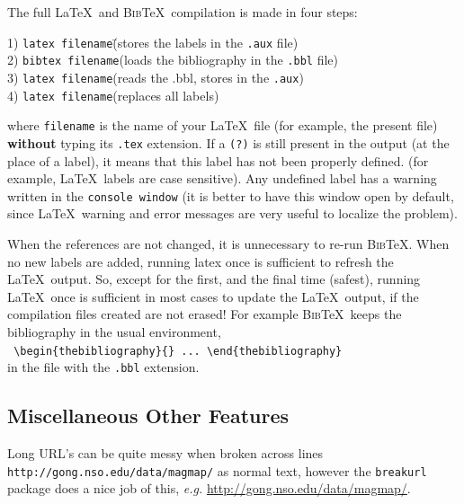 \documentclass[namedreferences]{solarphysics}
\newcommand{\BibTeX}{\textsc{Bib}\TeX}
\begin{document}
\begin{article}
   The full \LaTeX\ and \BibTeX\ compilation is made in four steps: 
\begin{tabbing}
1) {\tt latex filename}\qquad\qquad\=(stores the labels in the {\tt .aux} file)\\
2) {\tt bibtex filename}\>(loads the bibliography in the {\tt .bbl} file)\\
3) {\tt latex filename}\>(reads the .bbl, stores in the {\tt .aux})\\
4) {\tt latex filename}\>(replaces all labels)  
\end{tabbing}
   where \texttt{filename} is the name of your \LaTeX\ file (for example, 
the present file) {\bf without} typing its \texttt{.tex} extension.
If a \texttt{(?)} is still present in the output (at the place of a label),
it means that this label has not been properly defined. 
 (for example, \LaTeX\ labels are case sensitive).
Any undefined label has a warning written in the \texttt{console window}
(it is better to have this window open by default, since \LaTeX\ warning and 
error messages are very useful to localize the problem).

  When the references are not changed, it is unnecessary to re-run \BibTeX .
When no new labels are added, running latex once is sufficient to refresh
the \LaTeX\ output. So, except for
the first, and the final time (safest), running \LaTeX\ once is sufficient
in most cases to update the \LaTeX\ output, if the compilation files 
created are not erased! For example \BibTeX\ keeps the bibliography in the usual 
environment,\\
  \verb+ \begin{thebibliography}{} ... \end{thebibliography}+\\
in the file with the \verb+.bbl+ extension.  

\subsection{Miscellaneous Other Features} %
      \label{S-Miscellaneous} 
Long URL's can be quite messy when broken across lines
\texttt{ http://gong.nso.edu/data/magmap/} as normal text,
however the \texttt{breakurl} package does a nice job of this, \textit{e.g.}%
\url{http://gong.nso.edu/data/magmap/}.
   

\end{article}
\end{document}
